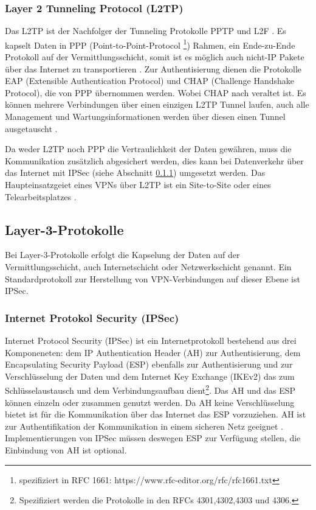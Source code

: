 \subsubsection{Layer 2 Tunneling Protocol (L2TP)}
Das L2TP ist der Nachfolger der Tunneling Protokolle PPTP und L2F \cite{isi-vpn}. Es kapselt Daten in PPP (Point-to-Point-Protocol \footnote{spezifiziert in RFC 1661: https://www.rfc-editor.org/rfc/rfc1661.txt}) Rahmen, ein Ende-zu-Ende Protokoll auf der Vermittlungsschicht, somit ist es möglich auch nicht-IP Pakete über das Internet zu transportieren \cite{gokulakrishnan2014survey}. Zur Authentisierung dienen die Protokolle EAP (Extensible Authentication Protocol) und CHAP (Challenge Handshake Protocol), die von PPP übernommen werden. Wobei CHAP nach \cite{eckert2018sicherheit} veraltet ist. 
Es können mehrere Verbindungen über einen einzigen L2TP Tunnel laufen, auch alle Management und Wartungsinformationen werden über diesen einen Tunnel ausgetauscht \cite{bohmer2005vpn}.

Da weder L2TP noch PPP die Vertraulichkeit der Daten gewähren, muss die Kommunikation zusätzlich abgesichert werden, dies kann bei Datenverkehr über das Internet mit IPSec (siehe Abschnitt \ref{subsub:L3}) umgesetzt werden. 
Das Haupteinsatzgeiet eines VPNs über L2TP ist ein Site-to-Site oder eines Telearbeitsplatzes \cite{isi-vpn}.   

\subsection{Layer-3-Protokolle}
Bei Layer-3-Protokolle erfolgt die Kapselung der Daten auf der Vermittlungsschicht, auch Internetschicht oder Netzwerkschicht genannt. Ein Standardprotokoll zur Herstellung von VPN-Verbindungen auf dieser Ebene ist IPSec.

\subsubsection{Internet Protokol Security (IPSec)}
\label{subsub:L3}
Internet Protocol Security (IPSec) ist ein Internetprotokoll bestehend aus drei Komponeneten: dem IP Authentication Header (AH) zur Authentisierung, dem Encapsulating Security Payload (ESP) ebenfalls zur Authentisierung und zur Verschlüsselung der Daten und dem Internet Key Exchange (IKEv2) das zum Schlüsselaustausch und dem Verbindungsaufbau dient\footnote{Spezifiziert werden die Protokolle in den RFCs 4301,4302,4303 und 4306.}. Das AH und das ESP können einzeln oder zusammen genutzt werden. Da AH keine Verschlüsselung bietet ist für die Kommunikation über das Internet das ESP vorzuziehen. AH ist zur Authentifikation der Kommunikation in einem sicheren Netz geeignet \cite{isi-vpn}. Implementierungen von IPSec müssen deswegen ESP zur Verfügung stellen, die Einbindung von AH ist optional.

